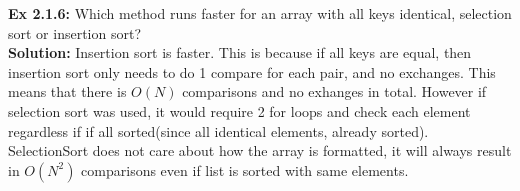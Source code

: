 \documentclass[11pt,fleqn]{article}
\begin{document}
\textbf{Ex 2.1.6:} Which method runs faster for an array with all keys identical, selection sort or
insertion sort?\\
	
\textbf{Solution:}
Insertion sort is faster. This is because if all keys are equal, then insertion sort only needs to do 1 compare for each pair, and no exchanges. This means that there is $O(N)$ comparisons and no exhanges in total. However if selection sort was used, it would require 2 for loops and check each element regardless if if all sorted(since all identical elements, already sorted). SelectionSort does not care about how the array is formatted, it will always result in $O(N^2)$ comparisons even if list is sorted with same elements.
\end{document}
